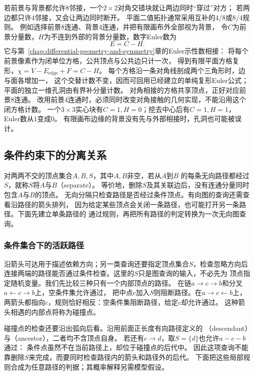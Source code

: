 若前景与背景都允许8邻接，一个$2\times2$对角交错块就让两边同时“穿过”对方；
若两边都只许4邻接，又会让两边同时断开。
平面二值拓扑通常采用互补的4/8或8/4规则。
例如选择前景8连通、背景4连通，并把有限画布外全部视为背景，
令$C$为前景分量数，$H$为不连到外部的背景分量数，数字Euler数为
\begin{equation}
 E=C-H.
 \label{eq:graph-digital-euler}
\end{equation}
它与第~\ref{chap:differential-geometry-and-symmetry}章的Euler示性数相接：
将每个前景像素作为闭单位方格，公共顶点与公共边只计一次，
得到有限平面方格复形，$\chi=V-E_{\mathrm{edge}}+F=C-H$。
每个方格沿一条对角线剖成两个三角形时，边与面各增加一，
这个交替计数不变，因而可回用已经建立的单纯复形Euler公式；
平面的独立一维孔洞由有界补分量计数。
对角相接的方格共享顶点，正好对应前景8连通。
改用前景4连通时，必须同时改变对角接触的几何实现，不能沿用这个闭方格计数。
一个$3\times3$实心块有$C=1,H=0$；挖去中心后有$C=1,H=1$，Euler数从$1$变成$0$。
有限画布边缘的背景没有先与外部相接时，孔洞也可能被误计。

\subsection{条件约束下的分离关系}

对两两不交的顶点集合\(A,B,S\)，其中\(A,B\)非空，若从\(A\)到\(B\)
的每条无向路径都经过\(S\)，就称\(S\)将\(A\)与\(B\)（separate）。
等价地，删除\(S\)及其关联边后，没有连通分量同时包含\(A\)与\(B\)的顶点。
无向分隔只检查路径是否经过条件顶点。有向图的查询还需查看沿路径的箭头排列，
因为给定某些顶点会关闭一条路径，也可能打开另一条路径。下面先建立单条路径的
通过规则，再把所有路径的判定转换为一次无向图查询。

\subsubsection{条件集合下的活跃路径}
\label{sec:graph-theory-active-paths}

沿箭头可达用于描述依赖方向；另一类查询还要指定顶点集合\(S\)，检查忽略方向后
连接两端的路径能否通过条件检查。这里的\(S\)只是图查询的输入，不必先为
顶点指定随机变量。我们先比较三种只有一个内部顶点的路径。
在链\(a\to c\to b\)和分叉\(a\leftarrow c\to b\)上，空条件集允许通过，
把中点\(c\)加入\(S\)则阻断路径。在\(a\to c\leftarrow b\)上，
两箭头都指向\(c\)，规则恰好相反：空条件集阻断路径，给定\(c\)却允许通过。
这种箭头相遇的内部点将称为碰撞点。

碰撞点的检查还要沿出弧向后看。沿用前面正长度有向路径定义的
（descendant）与（ancestor），二者均不含顶点自身。
若还有\(c\to d\)，取\(S=\{d\}\)也允许\(a-c-b\)通过：
条件点虽然不在当前路径上，却位于碰撞点的后代中。
因此这项查询不能靠删除\(S\)来完成，而要同时检查路径内的箭头和路径外的后代。
下面把这些局部规则合成为任意路径的判据；其概率解释另需模型假设。

